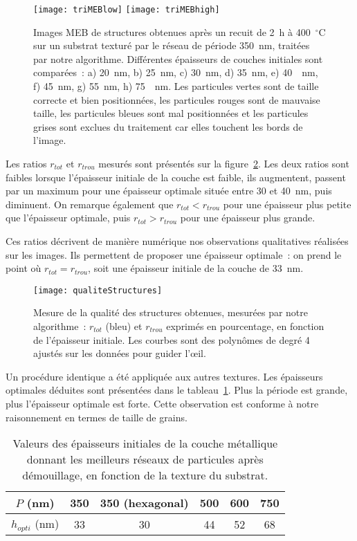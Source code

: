 \begin{figure}[!p]
\centering
\texttt{[image: triMEBlow]}
\texttt{[image: triMEBhigh]}
\caption{Images MEB de structures obtenues après un recuit de 2~h à 400~$^\circ$C sur un substrat texturé par le réseau de période 350~nm, traitées par notre algorithme. Différentes épaisseurs de couches initiales sont comparées~: a) 20~nm, b) 25~nm, c) 30~nm, d) 35~nm, e) 40~~nm, f) 45~nm, g) 55~nm, h) 75~~nm. Les particules vertes sont de taille correcte et bien positionnées, les particules rouges sont de mauvaise taille, les particules bleues sont mal positionnées et les particules grises sont exclues du traitement car elles touchent les bords de l'image.}
\label{triMEB350}
\end{figure}

Les ratios $r_{tot}$ et $r_{trou}$ mesurés sont présentés sur la figure~\ref{qualiteStructures}. Les deux ratios sont faibles lorsque l'épaisseur initiale de la couche est faible, ils augmentent, passent par un maximum pour une épaisseur \og optimale \fg{}  située entre 30 et 40~nm, puis diminuent. On remarque également que $r_{tot}<r_{trou}$ pour une épaisseur plus petite que l'épaisseur optimale, puis $r_{tot}>r_{trou}$ pour une épaisseur plus grande.\par 
Ces ratios décrivent de manière numérique nos observations qualitatives réalisées sur les images. Ils permettent de proposer une épaisseur optimale~: on prend le point où 
$r_{tot}=r_{trou}$, soit une épaisseur initiale de la couche de 33~nm.\par 
\begin{figure}[!htb]
\centering
\texttt{[image: qualiteStructures]}
\caption{Mesure de la qualité des structures obtenues, mesurées par notre algorithme~: $r_{tot}$ (bleu) et $r_{trou}$ exprimés en pourcentage, en fonction de l’épaisseur initiale. Les courbes sont des polynômes de degré 4 ajustés sur les données pour guider l'œil.}
\label{qualiteStructures}
\end{figure}

Un procédure identique a été appliquée aux autres textures. Les épaisseurs optimales déduites sont présentées dans le tableau~\ref{tOptimaux}. Plus la période est grande, plus l'épaisseur optimale est forte. Cette observation est conforme à notre raisonnement en termes de taille de grains.\par 

\begin{table}[!htb]
\centering
\begin{tabular}{cccccc}
\hline
$P$ (nm) & 350 & 350 (hexagonal) & 500 & 600 & 750 \\
\hline
$h_{opti}$ (nm)&  33 & 30 & 44 & 52 & 68\\
\hline
\end{tabular}
\caption{Valeurs des épaisseurs initiales de la couche métallique donnant les meilleurs réseaux de particules après démouillage, en fonction de la texture du substrat.}
\label{tOptimaux}
\end{table}

